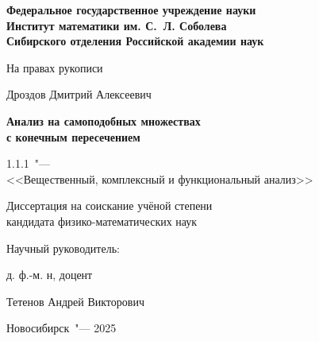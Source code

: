 \thispagestyle{empty}
\begin{center}
\textbf{
Федеральное государственное учреждение науки\\
Институт математики им. С.~Л. Соболева\\
Сибирского отделения Российской академии наук}
\end{center}

\vspace{0pt plus4fill}
\begin{flushright}
На правах рукописи
\end{flushright}


\vspace{0pt plus6fill}
\begin{center}
{\large Дроздов Дмитрий Алексеевич}
\end{center}

\vspace{0pt plus1fill}
\begin{center}
\textbf {\large %
Анализ на самоподобных множествах \\
с конечным пересечением}

\vspace{0pt plus2fill} 
{%
1.1.1\ "---\\
<<Вещественный, комплексный и функциональный анализ>>}

\vspace{0pt plus2fill}
Диссертация на соискание учёной степени\\
кандидата физико-математических наук
\end{center}

\vspace{0pt plus4fill}
\noindent\hspace{0.6\textwidth}Научный руководитель:

\noindent\hspace{0.6\textwidth}д. ф.-м. н, доцент

\noindent\hspace{0.6\textwidth}Тетенов Андрей Викторович


\vspace{0pt plus4fill}
{\centering Новосибирск\ "--- 2025\par}